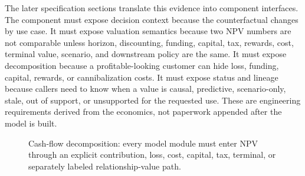 \documentclass[11pt]{article}
\newcommand{\1}{\mathbf{1}}
\begin{document}
The later specification sections translate this evidence into component
interfaces. The component must expose decision context because the
counterfactual changes by use case. It must expose valuation semantics because
two NPV numbers are not comparable unless horizon, discounting, funding,
capital, tax, rewards, cost, terminal value, scenario, and downstream policy are
the same. It must expose decomposition because a profitable-looking customer
can hide loss, funding, capital, rewards, or cannibalization costs. It must
expose status and lineage because callers need to know when a value is causal,
predictive, scenario-only, stale, out of support, or unsupported for the
requested use. These are engineering requirements derived from the economics,
not paperwork appended after the model is built.

\begin{figure}[t]
\centering
{}
\caption{Cash-flow decomposition: every model module must enter NPV through an explicit contribution, loss, cost, capital, tax, terminal, or separately labeled relationship-value path.}
\label{fig:npv-decomposition}
\end{figure}
\end{document}
